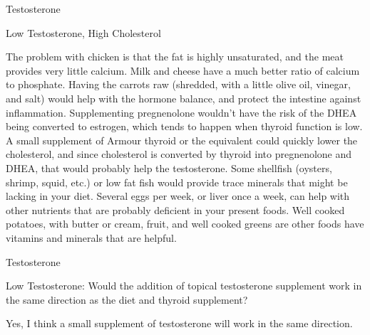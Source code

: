 \documentclass[11pt,oneside,openany,extrafontsizes]{memoir}
\begin{document}
\begin{standalonequote}{Testosterone}
    \begin{note}
        Low Testosterone, High Cholesterol
    \end{note}

    \begin{answer}
        The problem with chicken is that the fat is highly unsaturated, and the meat provides very little calcium. Milk and cheese have a much better ratio of calcium to phosphate. Having the carrots raw (shredded, with a little olive oil, vinegar, and salt) would help with the hormone balance, and protect the intestine against inflammation. Supplementing pregnenolone wouldn't have the risk of the DHEA being converted to estrogen, which tends to happen when thyroid function is low. A small supplement of Armour thyroid or the equivalent could quickly lower the cholesterol, and since cholesterol is converted by thyroid into pregnenolone and DHEA, that would probably help the testosterone. Some shellfish (oysters, shrimp, squid, etc.) or low fat fish would provide trace minerals that might be lacking in your diet. Several eggs per week, or liver once a week, can help with other nutrients that are probably deficient in your present foods. Well cooked potatoes, with butter or cream, fruit, and well cooked greens are other foods have vitamins and minerals that are helpful.
    \end{answer}
\end{standalonequote}

\begin{qaexchange}{Testosterone}

    \begin{question}
        Low Testosterone: Would the addition of topical testosterone supplement work in the same direction as the diet and thyroid supplement?
    \end{question}

    \begin{answer}
        Yes, I think a small supplement of testosterone will work in the same direction.
    \end{answer}
\end{qaexchange}
\end{document}

